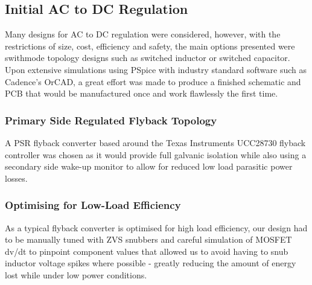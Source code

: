 \documentclass[9pt, technote, a4paper, nofonttune]{IEEEphot}
\begin{document}
        \subsection{Initial AC to DC Regulation}
        \hspace{0.5cm}Many designs for AC to DC regulation were considered, however, with the restrictions of size, cost, efficiency and safety, the main options presented were swithmode topology designs such as switched inductor or switched capacitor.  Upon extensive simulations using PSpice with industry standard software such as Cadence's OrCAD, a great effort was made to produce a finished schematic and PCB that would be manufactured once and work flawlessly the first time.
        \subsubsection{Primary Side Regulated Flyback Topology}
        \hspace{0.5cm}A PSR flyback converter based around the Texas Instruments UCC28730 flyback controller was chosen as it would provide full galvanic isolation while also using a secondary side wake-up monitor to allow for reduced low load parasitic power losses.
        \subsubsection{Optimising for Low-Load Efficiency}
        \hspace{0.5cm}As a typical flyback converter is optimised for high load efficiency, our design had to be manually tuned with ZVS snubbers and careful simulation of MOSFET dv/dt to pinpoint component values that allowed us to avoid having to snub inductor voltage spikes where possible - greatly reducing the amount of energy lost while under low power conditions.
\end{document}
